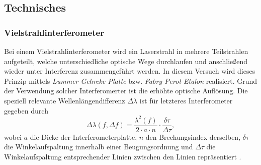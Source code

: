 \documentclass[../main.tex]{subfiles}
\begin{document}
    \subsection{Technisches}
        \subsubsection*{Vielstrahlinterferometer}
            Bei einem Vielstrahlinterferometer wird ein Laserstrahl in mehrere Teilstrahlen aufgeteilt, welche unterschiedliche optische Wege durchlaufen und anschließend wieder unter Interferenz zusammengeführt werden. In diesem Versuch wird dieses Prinzip mittels \emph{Lummer Gehrcke Platte} bzw. \emph{Fabry-Perot-Etalon} realisiert. Grund der Verwendung solcher Interferomerter ist die erhöhte optische Auflösung. Die speziell relevante Wellenlängendifferenz $\Delta\lambda$ ist für letzteres Interferometer gegeben durch
            \[
                \Delta\lambda(f,\Delta f)=\frac{\lambda^2(f)}{2\cdot a\cdot n}\cdot\frac{\delta\tau}{\Delta\tau},
            \]
            wobei $a$ die Dicke der Interferometerplatte, $n$ den Brechungsindex derselben, $\delta\tau$ die Winkelaufspaltung innerhalb einer Beugungsordnung und $\Delta\tau$ die Winkelaufspaltung entsprechender Linien zwischen den Linien repräsentiert \cite[p.703f]{skript}. 
            
\end{document}
